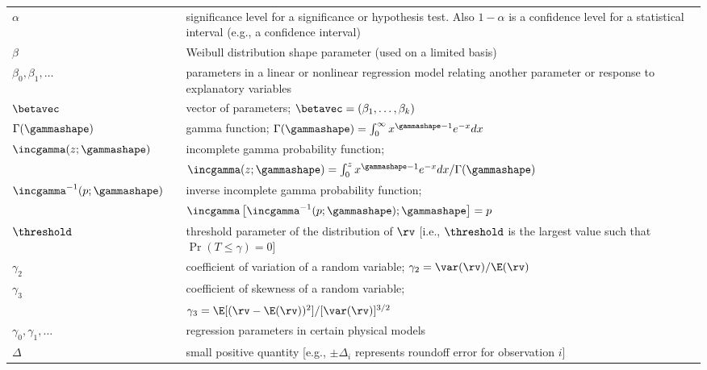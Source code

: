 \begin{supertabular}{p{0.9in}lp{4.0in}}
   \\
$\alpha$     &  
& significance level for a significance or hypothesis test.
Also  $1-\alpha$ is a   confidence level for a statistical
interval (e.g., a confidence interval)
   \\
$\beta $     & 
&Weibull distribution shape parameter (used on 
a limited basis) 
   \\
$\beta_{0},\beta_{1}, \ldots$ & 
&parameters in a linear or nonlinear regression model
relating another parameter or response to explanatory variables
   \\
$\betavec $     & 
&vector of parameters; $\betavec=(\beta_{1},\dots,\beta_{k})$
\\
$\Gamma(\gammashape)$ &
& gamma function; 
$\Gamma(\gammashape)=\int_{0}^{\infty} x^{\gammashape-1}e^{-x}dx$
    \\
$\incgamma(z;\gammashape)$ &
&incomplete gamma probability function;\\ 
&&$\incgamma(z;\gammashape)=\int_{0}^{z} x^{\gammashape-1}e^{-x}dx/\Gamma(\gammashape)$
  \\
$\incgamma^{-1}(p;\gammashape)$ &
&inverse incomplete gamma probability function; \\
&&$\incgamma
\left [\incgamma^{-1}(p;\gammashape);\gammashape \right ]=
p$
  \\
$\threshold$   & 
&threshold parameter of the distribution of 
$\rv$ [i.e.,  $\threshold$ is the largest value such 
 that $\Pr(T \leq \gamma)=0$]
  \\
$\gamma_{2}$   & 
& coefficient of variation of a random variable;
$\gamma_{2}=\var(\rv)/\E(\rv)$
   \\
$\gamma_{3}$   & 
& coefficient of skewness of a random variable;\\
&&
$\gamma_{3}=\E[(\rv-\E(\rv))^{2}]/[\var(\rv)]^{3/2}$
   \\
$\gamma_{0}, \gamma_{1}, \ldots $   & 
& regression parameters in certain physical models
\\
$\Delta$ & 
& small positive quantity [e.g., $\pm \Delta_{i}$ represents roundoff error
for observation $i$]
    \\

\end{supertabular}

